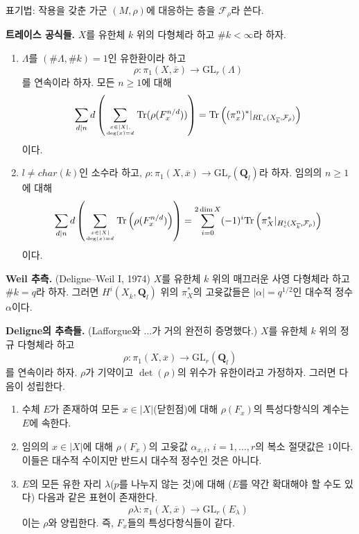 \noindent
표기법: 작용을 갖춘 가군 $(M, \rho)$에 대응하는 층을
$\mathcal{F}_\rho$라 쓴다.

\medskip\noindent
{\bf 트레이스 공식들.} $X$를 유한체 $k$ 위의 다형체라 하고
$\# k < \infty$라 하자.
\begin{enumerate}
\item $\Lambda$를 $(\# \Lambda, \# k)=1$인 유한환이라 하고
$$
\rho : \pi_1(X, \overline{x})\to \text{GL}_r(\Lambda)
$$
를 연속이라 하자. 모든 $n\geq 1$에 대해
$$
\sum_{d|n}d\left(
\sum_{x\in |X|, \atop \deg(x)=d}
\text{Tr}(\rho(F_x^{n/d}))\right) =
\text{Tr}\left(
(\pi_x^n)^* |_{R\Gamma_c(X_{\overline{k}}, \mathcal{F}_\rho)}\right)
$$
이다.
\item $l\neq char(k)$인 소수라 하고, $\rho : \pi_1(X, \overline{x})\to
\text{GL}_r(\mathbf{Q}_l)$라 하자. 임의의 $n\geq 1$에 대해
$$
\sum_{d|n} d\left(
\sum_{x\in |X| \atop \deg(x)=d}
\text{Tr}
\left(
\rho(F_x^{n/d})
\right)
\right) =
\sum_{i = 0}^{2\dim X}
(-1)^i
\text{Tr}\left(
\pi_X^* |_{H_c^i(X_{\overline{k}}, \mathcal{F}_\rho)}\right)
$$
이다.
\end{enumerate}

\noindent
{\bf Weil 추측.} (Deligne--Weil I, 1974) $X$를 유한체 $k$ 위의 매끄러운
사영 다형체라 하고 $\# k = q$라 하자. 그러면
$H^i(X_{\overline{k}}, \mathbf{Q}_l)$ 위의 $\pi_X^*$의 고윳값들은
$|\alpha|=q^{1/2}$인 대수적 정수 $\alpha$이다.

\medskip\noindent
{\bf Deligne의 추측들.} (Lafforgue와 $\ldots$가 거의 완전히 증명했다.) $X$를
유한체 $k$ 위의 정규 다형체라 하고
$$
\rho : \pi_1(X, \overline{x}) \longrightarrow \text{GL}_r(\mathbf{Q}_l)
$$
를 연속이라 하자. $\rho$가 기약이고 $\det(\rho)$의 위수가 유한이라고
가정하자. 그러면 다음이 성립한다.
\begin{enumerate}
\item 수체 $E$가 존재하여 모든 $x\in |X|$(닫힌점)에 대해
$\rho(F_x)$의 특성다항식의 계수는 $E$에 속한다.
\item 임의의 $x\in |X|$에 대해 $\rho(F_x)$의 고윳값
$\alpha_{x, i}$, $i = 1, \ldots, r$의 복소 절댓값은 $1$이다.
이들은 대수적 수이지만 반드시 대수적 정수인 것은 아니다.
\item $E$의 모든 유한 자리 $\lambda$($p$를 나누지 않는 것)에 대해
($E$를 약간 확대해야 할 수도 있다) 다음과 같은 표현이 존재한다.
$$
\rho\lambda : \pi_1(X, \overline{x}) \to \text{GL}_r(E_\lambda)
$$
이는 $\rho$와 양립한다. 즉, $F_x$들의 특성다항식들이 같다.
\end{enumerate}

